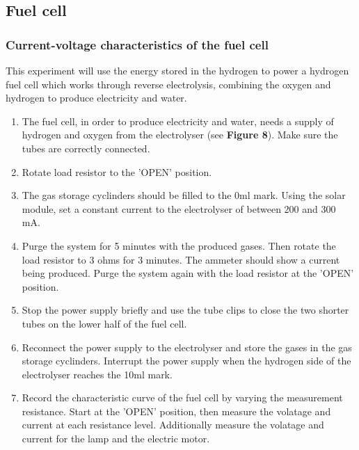 \documentclass{article}
\begin{document}
    \subsection{Fuel cell}
    \subsubsection{Current-voltage characteristics of the fuel cell}
    This experiment will use the energy stored in the hydrogen to power a hydrogen fuel cell which works through reverse 
    electrolysis, combining the oxygen and hydrogen to produce electricity and water.
    \begin{enumerate}
        \item  The fuel cell, in order to produce electricity and water, needs a supply of hydrogen and oxygen from the 
        electrolyser (see \textbf{Figure 8}). Make sure the tubes are correctly connected.
        \item Rotate load resistor to the 'OPEN' position.
        \item The gas storage cyclinders should be filled to the 0ml mark. Using the solar module, set a constant current 
        to the electrolyser of between 200 and 300 mA.
        \item Purge the system for 5 minutes with the produced gases. Then rotate the load resistor to 3 ohms for 3 minutes. 
        The ammeter should show a current being produced. Purge the system again with the load resistor at the 'OPEN' position.
        \item Stop the power supply briefly and use the tube clips to close the two shorter tubes on the lower half of the fuel cell.
        \item Reconnect the power supply to the electrolyser and store the gases in the gas storage cyclinders. Interrupt the power 
        supply when the hydrogen side of the electrolyser reaches the 10ml mark.
        \item Record the characteristic curve of the fuel cell by varying the measurement resistance. Start at the 'OPEN' position, 
        then measure the volatage and current at each resistance level. Additionally measure the volatage and current for the lamp 
        and the electric motor.
    \end{enumerate}
\end{document}
